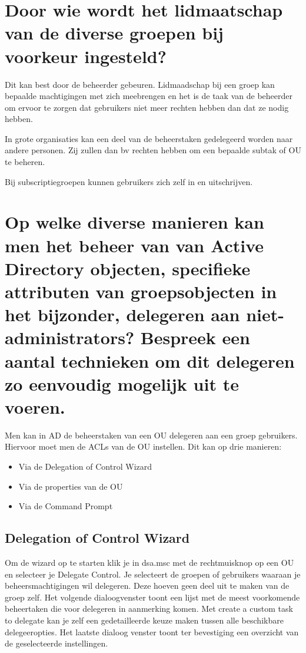 \section{Door wie wordt het lidmaatschap van de diverse groepen bij voorkeur
ingesteld?}

Dit kan best door de beheerder gebeuren. Lidmaadschap bij een groep kan bepaalde
machtigingen met zich meebrengen en het is de taak van de beheerder om ervoor te
zorgen dat gebruikers niet meer rechten hebben dan dat ze nodig hebben.

In grote organisaties kan een deel van de beheerstaken gedelegeerd worden naar
andere personen. Zij zullen dan bv rechten hebben om een bepaalde subtak of OU
te beheren.

Bij subscriptiegroepen kunnen gebruikers zich zelf in en uitschrijven.

\section{Op welke diverse manieren kan men het beheer van van Active Directory
objecten, specifieke attributen van groepsobjecten in het bijzonder, delegeren
aan niet-administrators? Bespreek een aantal technieken om dit delegeren zo
eenvoudig mogelijk uit te voeren.}

Men kan in AD de beheerstaken van een OU delegeren aan een groep gebruikers.
Hiervoor moet men de ACLs van de OU instellen. Dit kan op drie manieren:
\begin{itemize}
	\item Via de Delegation of Control Wizard
	\item Via de properties van de OU
	\item Via de Command Prompt
\end{itemize}

\subsection{Delegation of Control Wizard}

Om de wizard op te starten klik je in dsa.msc met de rechtmuisknop op een OU en
selecteer je Delegate Control. Je selecteert de groepen of gebruikers waaraan je
beheersmachtigingen wil delegeren. Deze hoeven geen deel uit te maken van de
groep zelf. Het volgende dialoogvenster toont een lijst met de meest voorkomende
beheertaken die voor delegeren in aanmerking komen. Met create a custom task to
delegate kan je zelf een gedetailleerde keuze maken tussen alle beschikbare
delegeeropties. Het laatste dialoog venster toont ter bevestiging een overzicht
van de geselecteerde instellingen.

